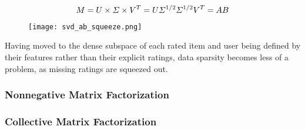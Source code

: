 \begin{equation} \label{eq:svd_AB_squeezing}
	\centering
	M = U\times \Sigma \times V^T = U\Sigma^{1/2} \Sigma^{1/2}V^T = AB
\end{equation}

\begin{figure} [H]
	\centering
	\texttt{[image: svd\_ab\_squeeze.png]}
\end{figure}
Having moved to the dense subspace of each rated item and user being defined by their features rather than their explicit ratings, data sparsity becomes less of a problem, as missing ratings are squeezed out.




\subsubsection{Nonnegative Matrix Factorization}


\subsubsection{Collective Matrix Factorization}
